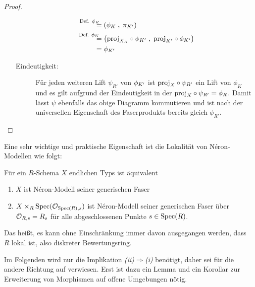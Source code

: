 \begin{Satz}
\begin{proof}
\begin{enumerate}[resume*,start=1]
\begin{description}
\begin{align*}
          &\overset{\mathllap{\text{Def. }\phi_R}}{=} \left(
            \phi_{\K}\;,\; \pi_{\K'}
            \right)\\
          &\overset{\mathllap{\text{Def. }\phi_\K}}{=} \left(
            \proj_{X_\K}\circ\phi_{\K'}\;,\;
            \proj_{\K'}\circ\phi_{\K'}
            \right)\\
          &= \phi_{\K'}
        \end{align*}
      \item[Eindeutigkeit:]
        Für jeden weiteren Lift $\psi_{R'}$ von $\phi_{K'}$ ist
        $\text{proj}_{X}\circ\psi_{R'}$ ein Lift von $\phi_{K}$ und es gilt
        aufgrund der Eindeutigkeit in der \NAbbEig
        ${\text{proj}_{X}\circ\psi_{R'}=\phi_{R}}$.
        Damit lässt $\psi$ ebenfalls das obige Diagramm kommutieren
        und ist nach der universellen Eigenschaft des Faserprodukts
        bereits gleich $\phi_{R'}$.
        \qedhere
      \end{description}
    \end{enumerate}
  \end{proof}
\end{Satz}

Eine sehr wichtige und praktische Eigenschaft ist die Lokalität von
Néron-Modellen wie folgt:
\begin{Satz}\label{thm:neronmodelllokal}
  Für ein $R$-Schema $X$ endlichen Typs ist äquivalent
  \begin{enumerate}[label=(\roman*)]
  \item $X$ ist Néron-Modell seiner generischen Faser
  \item $X\times_R\operatorname{Spec}(\mathcal{O}_{\operatorname{Spec}(R),s})$ ist Néron-Modell
    seiner generischen Faser über $\mathcal{O}_{R,s}=R_s$ für alle
    abgeschlossenen Punkte $s\in\operatorname{Spec}(R)$.
  \end{enumerate}
  Das heißt, es kann ohne Einschränkung immer davon ausgegangen
  werden, dass $R$ lokal ist, also diskreter Bewertungsring.
\end{Satz}

Im Folgenden wird nur die Implikation
\emph{(ii)}$\Rightarrow$\emph{(i)} benötigt, daher sei für die
andere Richtung auf \cite[Proposition~1.2/4]{neron} verwiesen.
Erst ist dazu ein Lemma und ein Korollar zur Erweiterung von
Morphismen auf offene Umgebungen nötig.

